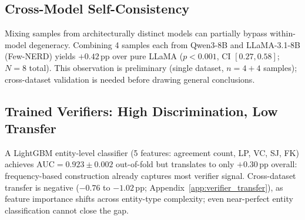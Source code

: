 \subsection{Cross-Model Self-Consistency}\label{sec:cross_model}

Mixing samples from architecturally distinct models can partially bypass within-model degeneracy.
Combining 4 samples each from Qwen3-8B and LLaMA-3.1-8B (Few-NERD) yields $+0.42$\,pp over pure LLaMA ($p{<}0.001$, CI $[0.27, 0.58]$; $N{=}8$ total).
This observation is preliminary (single dataset, $n{=}4{+}4$ samples); cross-dataset validation is needed before drawing general conclusions.

\subsection{Trained Verifiers: High Discrimination, Low Transfer}\label{sec:verifier}

A LightGBM entity-level classifier (5 features: agreement count, LP, VC, SJ, FK) achieves AUC${=}0.923{\pm}0.002$ out-of-fold but translates to only $+0.30$\,pp overall: frequency-based construction already captures most verifier signal.
Cross-dataset transfer is negative ($-0.76$ to $-1.02$\,pp; Appendix~\ref{app:verifier_transfer}), as feature importance shifts across entity-type complexity; even near-perfect entity classification cannot close the gap.
